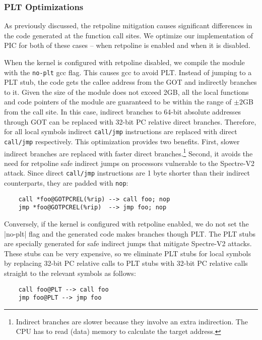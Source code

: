 \subsubsection*{PLT Optimizations}
As previously discussed, the retpoline mitigation causes significant differences in the code generated at the function call sites. We optimize our implementation of PIC for both of these cases -- when retpoline is enabled and when it is disabled.

When the kernel is configured with retpoline disabled, we compile the module with the \verb|no-plt| gcc flag. This causes gcc to avoid PLT. Instead of jumping to a PLT stub, the code gets the callee address from the GOT and indirectly branches to it.
Given the size of the module does not exceed 2GB, all the local functions and code pointers of the module are guaranteed to be within the range of $\pm 2$GB from the call site. In this case, indirect branches to 64-bit absolute addresses through GOT can be replaced with 32-bit PC relative direct branches. Therefore, for all local symbols indirect \verb|call/jmp| instructions are replaced with direct \verb|call/jmp| respectively. This optimization provides two benefits. First, slower indirect branches are replaced with faster direct branches.\footnote{Indirect branches are slower because they involve an extra indirection. The CPU has to read (data) memory to calculate the target address.} Second, it avoids the need for retpoline safe indirect jumps on processors vulnerable to the Spectre-V2 attack. Since direct \verb|call/jmp| instructions are 1 byte shorter than their indirect counterparts, they are padded with \verb|nop|:
\begin{verbatim}
    call *foo@GOTPCREL(%rip) --> call foo; nop
    jmp *foo@GOTPCREL(%rip)  --> jmp foo; nop
\end{verbatim}

Conversely, if the kernel is configured with retpoline enabled, we do not set the |no-plt| flag and the generated code makes branches though PLT. The PLT stubs are specially generated for safe indirect jumps that mitigate Spectre-V2 attacks. These stubs can be very expensive, so we eliminate PLT stubs for local symbols by replacing 32-bit PC relative calls to PLT stubs with 32-bit PC relative calls straight to the relevant symbols as follows:
\begin{verbatim}
    call foo@PLT --> call foo
    jmp foo@PLT --> jmp foo
\end{verbatim}

